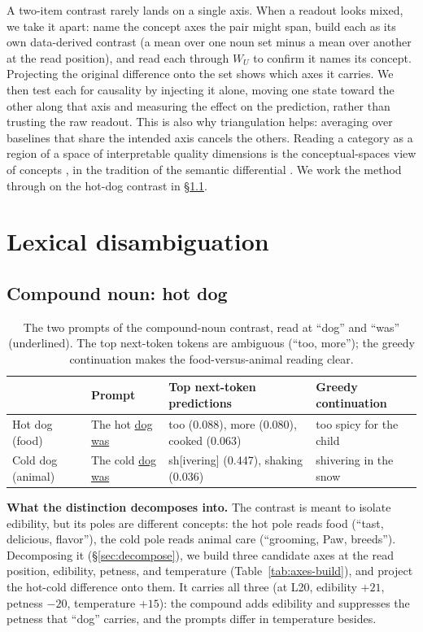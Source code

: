 \documentclass[11pt]{article}
\newcommand{\WU}{W_U}
\begin{document}
A two-item contrast rarely lands on a single axis. When a readout looks mixed, we
take it apart: name the concept axes the pair might span, build each as its own
data-derived contrast (a mean over one noun set minus a mean over another at the
read position), and read each through $\WU$ to confirm it names its concept.
Projecting the original difference onto the set shows which axes it carries. We
then test each for causality by injecting it alone, moving one state toward the
other along that axis and measuring the effect on the prediction, rather than
trusting the raw readout. This is also why triangulation helps: averaging over
baselines that share the intended axis cancels the others. Reading a category as
a region of a space of interpretable quality dimensions is the conceptual-spaces
view of concepts \citep{gardenfors2000}, in the tradition of the semantic
differential \citep{osgood1957}. We work the method through on the hot-dog
contrast in \S\ref{sec:compound}.

\section{Lexical disambiguation}

\subsection{Compound noun: hot dog}
\label{sec:compound}

\begin{table}[htbp]
\centering
\small
\begin{tabularx}{\columnwidth}{@{}llYY@{}}
\toprule
 & Prompt & Top next-token predictions & Greedy continuation \\
\midrule
Hot dog (food)    & The hot \underline{dog} \underline{was} & too (0.088), more (0.080), cooked (0.063) & too spicy for the child \\
Cold dog (animal) & The cold \underline{dog} \underline{was} & sh[ivering] (0.447), shaking (0.036) & shivering in the snow \\
\bottomrule
\end{tabularx}
\caption{The two prompts of the compound-noun contrast, read at ``dog'' and
``was'' (underlined). The top next-token tokens are ambiguous (``too, more''); the
greedy continuation makes the food-versus-animal reading clear.}
\label{tab:compound-prompts}
\end{table}

\textbf{What the distinction decomposes into.} The contrast is meant to isolate
edibility, but its poles are different concepts: the hot pole reads food (``tast,
delicious, flavor''), the cold pole reads animal care (``grooming, Paw,
breeds''). Decomposing it (\S\ref{sec:decompose}), we build three candidate axes
at the read position, edibility, petness, and temperature
(Table~\ref{tab:axes-build}), and project the hot-cold difference onto them. It
carries all three (at L20, edibility $+21$, petness $-20$, temperature $+15$):
the compound adds edibility and suppresses the petness that ``dog'' carries, and
the prompts differ in temperature besides.
\end{document}
